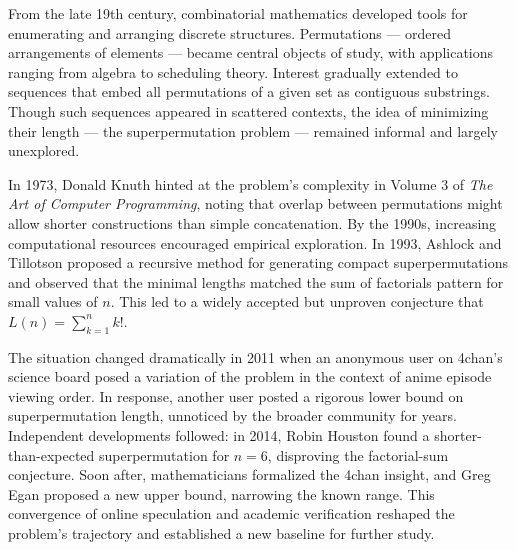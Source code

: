 \begin{historical}
From the late 19th century, combinatorial mathematics developed tools for enumerating and arranging discrete structures. Permutations — ordered arrangements of elements — became central objects of study, with applications ranging from algebra to scheduling theory. Interest gradually extended to sequences that embed all permutations of a given set as contiguous substrings. Though such sequences appeared in scattered contexts, the idea of minimizing their length — the superpermutation problem — remained informal and largely unexplored.

In 1973, Donald Knuth hinted at the problem's complexity in Volume 3 of \textit{The Art of Computer Programming}, noting that overlap between permutations might allow shorter constructions than simple concatenation. By the 1990s, increasing computational resources encouraged empirical exploration. In 1993, Ashlock and Tillotson proposed a recursive method for generating compact superpermutations and observed that the minimal lengths matched the sum of factorials pattern for small values of \( n \). This led to a widely accepted but unproven conjecture that \( L(n) = \sum_{k=1}^{n} k! \).

The situation changed dramatically in 2011 when an anonymous user on 4chan’s science board posed a variation of the problem in the context of anime episode viewing order. In response, another user posted a rigorous lower bound on superpermutation length, unnoticed by the broader community for years. Independent developments followed: in 2014, Robin Houston found a shorter-than-expected superpermutation for \( n = 6 \), disproving the factorial-sum conjecture. Soon after, mathematicians formalized the 4chan insight, and Greg Egan proposed a new upper bound, narrowing the known range. This convergence of online speculation and academic verification reshaped the problem’s trajectory and established a new baseline for further study.
\end{historical}
